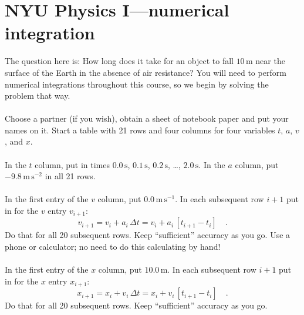 \documentclass[12pt]{article}
\newcommand{\m}{\mathrm{m}}
\newcommand{\s}{\mathrm{s}}
\newcommand{\mps}{\m\,\s^{-1}}
\newcommand{\mpss}{\m\,\s^{-2}}
\newcounter{problem}
\begin{document}
\sloppy\sloppypar\raggedbottom\frenchspacing\thispagestyle{empty}

\section*{NYU Physics I---numerical integration}

The question here is: How long does it take for an object to fall
$10\,\m$ near the surface of the Earth in the absence of air
resistance?  You will need to perform numerical integrations
throughout this course, so we begin by solving the problem that way.

\paragraph{\theproblem}%
Choose a partner (if you wish), obtain a sheet of notebook paper and
put your names on it.  Start a table with 21 rows and four columns for
four variables $t$, $a$, $v$, and $x$.

\paragraph{\theproblem}%
In the $t$ column, put in times $0.0\,\s$, $0.1\,\s$, $0.2\,\s$,
\ldots, $2.0\,\s$.  In the $a$ column, put $-9.8\,\mpss$ in all 21
rows.

\paragraph{\theproblem}%
In the first entry of the $v$ column, put $0.0\,\mps$.  In each
subsequent row $i+1$ put in for the $v$ entry $v_{i+1}$:
\begin{equation}
v_{i+1}= v_i + a_i\,\Delta t = v_i + a_i\,\left[t_{i+1}-t_i\right] \quad .
\end{equation}
Do that for all 20 subsequent rows.  Keep ``sufficient'' accuracy as
you go. Use a phone or calculator; no need to do this calculating by hand!

\paragraph{\theproblem}%
In the first entry of the $x$ column, put $10.0\,\m$.  In each
subsequent row $i+1$ put in for the $x$ entry $x_{i+1}$:
\begin{equation}
x_{i+1}= x_i + v_i\,\Delta t = x_i + v_i\,\left[t_{i+1}-t_i\right] \quad .
\end{equation}
Do that for all 20 subsequent rows.  Keep ``sufficient'' accuracy as
you go.
\end{document}
